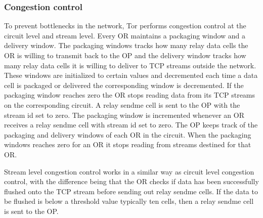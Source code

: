 \documentclass{llncs}
\begin{document}
\subsubsection{Congestion control}
To prevent bottlenecks in the network, Tor performs congestion control at the circuit level and stream level. Every OR maintains a packaging window and a delivery window. The packaging windows tracks how many relay data cells the OR is willing to transmit back to the OP and the delivery window tracks how many relay data cells it is willing to deliver to TCP streams outside the network. These windows are initialized to certain values and decremented each time a data cell is packaged or delivered the corresponding window is decremented. If the packaging window reaches zero the OR stops reading data from its TCP streams on the corresponding circuit. A relay sendme cell is sent to the OP with the stream id set to zero. The packaging window is incremented whenever an OR receives a relay sendme cell with stream id set to zero.
The OP keeps track of the packaging and delivery windows of each OR in the circuit. When the packaging windows reaches zero for an OR it stops reading from streams destined for that OR.

Stream level congestion control works in a similar way as circuit level congestion control, with the difference being that the OR checks if data has been successfully flushed onto the TCP stream before sending out relay sendme cells. If the data to be flushed is below a threshold value typically ten cells, then a relay sendme cell is sent to the OP.
\end{document}
